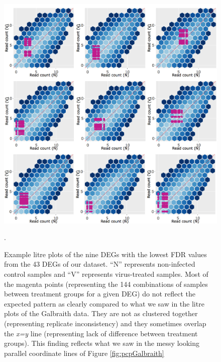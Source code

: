 \documentclass[11pt,a4paper,oldfontcommands,openany]{memoir}
\numberwithin{equation}{section} %
\begin{document}
\begin{figure}[H]
  \includegraphics[width=\textwidth]{Images/litreClusterRutter}
  \caption{Example litre plots of the nine DEGs with the lowest FDR values from the 43 DEGs of our dataset. ``N'' represents non-infected control samples and ``V'' represents virus-treated samples. Most of the magenta points (representing the 144 combinations of samples between treatment groups for a given DEG) do not reflect the expected pattern as clearly compared to what we saw in the litre plots of the Galbraith data. They are not as clustered together (representing replicate inconsistency) and they sometimes overlap the \textit{x=y} line (representing lack of difference between treatment groups). This finding reflects what we saw in the messy looking parallel coordinate lines of Figure \ref{fig:pcpGalbraith}}.
  \label{fig:litreClusterRutter}
\end{figure}
\end{document}
